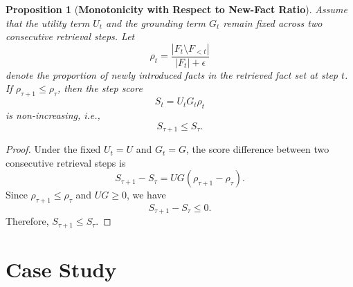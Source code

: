 \documentclass{article} %
\newtheorem{proposition}{Proposition}
\newcommand{\facts}{F}
\begin{document}
\begin{proposition}[\textbf{Monotonicity with Respect to New-Fact Ratio}]
Assume that the utility term $U_t$ and the grounding term $G_t$ remain fixed across two consecutive retrieval steps. Let
\[
\rho_t =
\frac{|F_t\setminus F_{<t}|}{|F_t|+\epsilon}
\]
denote the proportion of newly introduced facts in the retrieved fact set at step $t$. 
If $\rho_{\tau+1}\le \rho_{\tau}$, then the step score
\[
S_t = U_tG_t\rho_t
\]
is non-increasing, i.e.,
\[
S_{\tau+1}\le S_{\tau}.
\]
\end{proposition}

\begin{proof}
Under the fixed $U_t=U$ and $G_t=G$, the score difference between two consecutive retrieval steps is
\[
S_{\tau+1}-S_{\tau}
=
UG(\rho_{\tau+1}-\rho_{\tau}).
\]
Since $\rho_{\tau+1}\le \rho_{\tau}$ and $UG\ge 0$, we have
\[
S_{\tau+1}-S_{\tau}\le 0.
\]
Therefore, $S_{\tau+1}\le S_{\tau}$.
\end{proof}
\section{Case Study}
\end{document}
